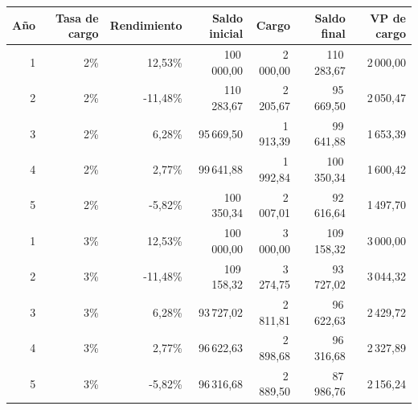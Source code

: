 \begin{tabular}{@{}rrrrrrr@{}}
\toprule
Año & Tasa de cargo & Rendimiento & Saldo inicial & Cargo & Saldo final & VP de cargo \\
\midrule
1 & 2\% & 12,53\% & 100\,000,00 & 2\,000,00 & 110\,283,67 & 2\,000,00 \\
2 & 2\% & -11,48\% & 110\,283,67 & 2\,205,67 & 95\,669,50 & 2\,050,47 \\
3 & 2\% & 6,28\% & 95\,669,50 & 1\,913,39 & 99\,641,88 & 1\,653,39 \\
4 & 2\% & 2,77\% & 99\,641,88 & 1\,992,84 & 100\,350,34 & 1\,600,42 \\
5 & 2\% & -5,82\% & 100\,350,34 & 2\,007,01 & 92\,616,64 & 1\,497,70 \\
1 & 3\% & 12,53\% & 100\,000,00 & 3\,000,00 & 109\,158,32 & 3\,000,00 \\
2 & 3\% & -11,48\% & 109\,158,32 & 3\,274,75 & 93\,727,02 & 3\,044,32 \\
3 & 3\% & 6,28\% & 93\,727,02 & 2\,811,81 & 96\,622,63 & 2\,429,72 \\
4 & 3\% & 2,77\% & 96\,622,63 & 2\,898,68 & 96\,316,68 & 2\,327,89 \\
5 & 3\% & -5,82\% & 96\,316,68 & 2\,889,50 & 87\,986,76 & 2\,156,24 \\
\bottomrule
\end{tabular}
